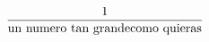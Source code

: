 \documentclass[preview]{standalone}
\begin{document}
\begin{align*}
\frac{1}{\text{un\ numero\ tan\ grande\ \newline como\ quieras}}
\end{align*}
\end{document}
